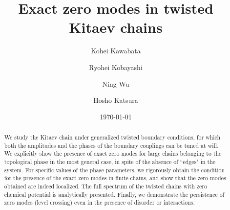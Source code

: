 \documentclass[aps, prb, showpacs, twocolumn, %
amssymb,superscriptaddress]{revtex4}
\begin{document}

\title{
Exact zero modes in twisted Kitaev chains
}

\author{Kohei Kawabata}

\author{Ryohei Kobayashi}

\author{Ning Wu}

\author{Hosho Katsura}


\date{\today}

\begin{abstract}
We study the Kitaev chain under generalized twisted boundary conditions, for which both the amplitudes and the phases of the boundary couplings can be tuned at will. 
We explicitly show the presence of %
exact zero modes for large chains belonging to the topological phase in the most general case, in spite of the absence of ``edges" in the system. For specific values of the phase parameters, we rigorously obtain the condition for the presence of the 
exact zero modes in finite chains, and show that the zero modes obtained are indeed localized. The full spectrum of the twisted chains with zero chemical potential is analytically presented. Finally, we demonstrate the persistence of zero modes (level crossing) even in the presence of disorder or %
interactions. 
\end{abstract}


\maketitle
\end{document}
